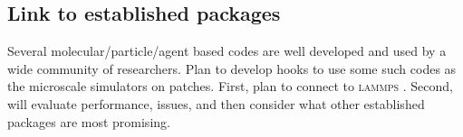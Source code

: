 \subsection{Link to established packages}

Several molecular\slash particle\slash agent based codes are well developed and used by a wide community of researchers.  
Plan to develop hooks to use some such codes as the microscale simulators on patches.
First, plan to connect to \textsc{lammps} \cite[]{LAMMPS}.
Second, will evaluate performance, issues, and then consider what other established packages are most promising.

